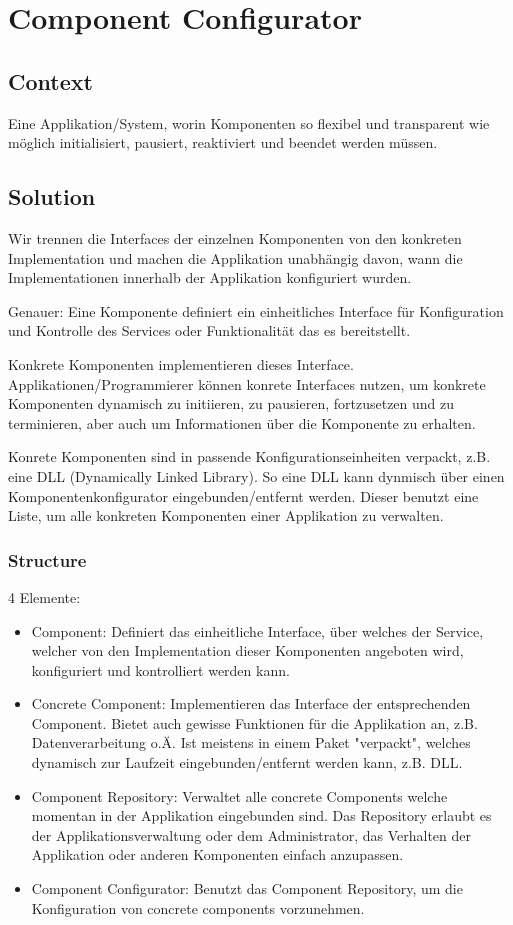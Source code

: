\chapter{Component Configurator}

\section{Context}
Eine Applikation/System, worin Komponenten so flexibel und transparent wie möglich initialisiert, pausiert, reaktiviert und beendet werden müssen.

\section{Solution}
Wir trennen die Interfaces der einzelnen Komponenten von den konkreten Implementation und machen die Applikation unabhängig davon, wann die Implementationen innerhalb der Applikation konfiguriert wurden.

Genauer: Eine Komponente definiert ein einheitliches Interface für Konfiguration und Kontrolle des Services oder Funktionalität das es bereitstellt.

Konkrete Komponenten implementieren dieses Interface. Applikationen/Programmierer können konrete Interfaces nutzen, um konkrete Komponenten dynamisch zu initiieren, zu pausieren, fortzusetzen und zu terminieren, aber auch um Informationen über die Komponente zu erhalten.

Konrete Komponenten sind in passende Konfigurationseinheiten verpackt, z.B. eine DLL (Dynamically Linked Library). So eine DLL kann dynmisch über einen Komponentenkonfigurator eingebunden/entfernt werden. Dieser benutzt eine Liste, um alle konkreten Komponenten einer Applikation zu verwalten.

\subsection{Structure}
4 Elemente:
\begin{itemize}
  \item Component: Definiert das einheitliche Interface, über welches der Service, welcher von den Implementation dieser Komponenten angeboten wird, konfiguriert und kontrolliert werden kann.
  \item Concrete Component: Implementieren das Interface der entsprechenden Component. Bietet auch gewisse Funktionen für die Applikation an, z.B. Datenverarbeitung o.Ä. Ist meistens in einem Paket "verpackt", welches dynamisch zur Laufzeit eingebunden/entfernt werden kann, z.B. DLL.
  \item Component Repository: Verwaltet alle concrete Components welche momentan in der Applikation eingebunden sind. Das Repository erlaubt es der Applikationsverwaltung oder dem Administrator, das Verhalten der Applikation oder anderen Komponenten einfach anzupassen.
  \item Component Configurator: Benutzt das Component Repository, um die Konfiguration von concrete components vorzunehmen.
\end{itemize}

